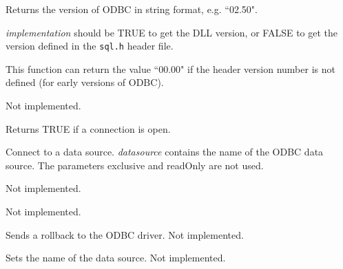 

Returns the version of ODBC in string format, e.g. ``02.50".

{\it implementation} should be TRUE to get the DLL version, or FALSE to get the
version defined in the {\tt sql.h} header file.

This function can return the value ``00.00" if the header version number is not defined (for early
versions of ODBC).



Not implemented.



Returns TRUE if a connection is open.

\label{wxdatabaseopen}


Connect to a data source. {\it datasource} contains the name of the ODBC data
source. The parameters exclusive and readOnly are not used.



Not implemented.  
  


Not implemented.



Sends a rollback to the ODBC driver. Not implemented.



Sets the name of the data source. Not implemented.
  

